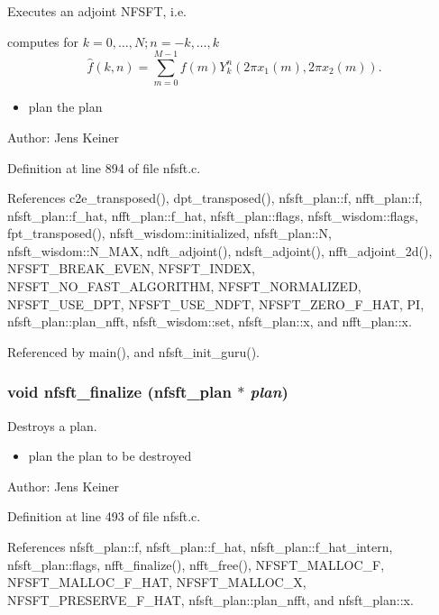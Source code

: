 Executes an adjoint NFSFT, i.e. 

computes for $k=0,\ldots,N; n=-k,\ldots,k$ \[ \hat{f}(k,n) = \sum_{m = 0}^{M-1} f(m) Y_k^n\left(2\pi x_1(m), 2\pi x_2(m)\right). \]

\begin{itemize}
\item plan the plan\end{itemize}
\begin{Desc}
\item[Author:]Jens Keiner \end{Desc}


Definition at line 894 of file nfsft.c.

References c2e\_\-transposed(), dpt\_\-transposed(), nfsft\_\-plan::f, nfft\_\-plan::f, nfsft\_\-plan::f\_\-hat, nfft\_\-plan::f\_\-hat, nfsft\_\-plan::flags, nfsft\_\-wisdom::flags, fpt\_\-transposed(), nfsft\_\-wisdom::initialized, nfsft\_\-plan::N, nfsft\_\-wisdom::N\_\-MAX, ndft\_\-adjoint(), ndsft\_\-adjoint(), nfft\_\-adjoint\_\-2d(), NFSFT\_\-BREAK\_\-EVEN, NFSFT\_\-INDEX, NFSFT\_\-NO\_\-FAST\_\-ALGORITHM, NFSFT\_\-NORMALIZED, NFSFT\_\-USE\_\-DPT, NFSFT\_\-USE\_\-NDFT, NFSFT\_\-ZERO\_\-F\_\-HAT, PI, nfsft\_\-plan::plan\_\-nfft, nfsft\_\-wisdom::set, nfsft\_\-plan::x, and nfft\_\-plan::x.

Referenced by main(), and nfsft\_\-init\_\-guru().\hypertarget{group__nfsft_ga63e193a27d84059742ff25ff81e2ed1}{
\subsubsection{\setlength{\rightskip}{0pt plus 5cm}void nfsft\_\-finalize ({\bf nfsft\_\-plan} $\ast$ {\em plan})}}
\label{group__nfsft_ga63e193a27d84059742ff25ff81e2ed1}


Destroys a plan. 

\begin{itemize}
\item plan the plan to be destroyed\end{itemize}
\begin{Desc}
\item[Author:]Jens Keiner \end{Desc}


Definition at line 493 of file nfsft.c.

References nfsft\_\-plan::f, nfsft\_\-plan::f\_\-hat, nfsft\_\-plan::f\_\-hat\_\-intern, nfsft\_\-plan::flags, nfft\_\-finalize(), nfft\_\-free(), NFSFT\_\-MALLOC\_\-F, NFSFT\_\-MALLOC\_\-F\_\-HAT, NFSFT\_\-MALLOC\_\-X, NFSFT\_\-PRESERVE\_\-F\_\-HAT, nfsft\_\-plan::plan\_\-nfft, and nfsft\_\-plan::x.

